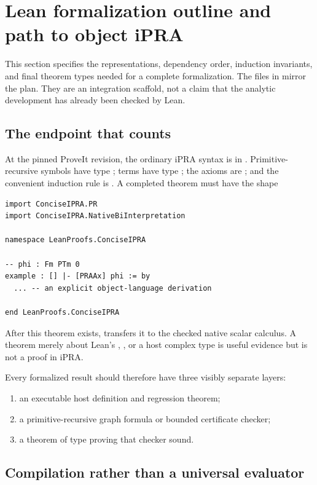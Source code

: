 \section{Lean formalization outline and path to object iPRA}\label{sec:formalization}

This section specifies the representations, dependency order, induction
invariants, and final theorem types needed for a complete formalization.  The
files in  mirror the plan.  They are an integration scaffold, not a
claim that the analytic development has already been checked by Lean.

\subsection{The endpoint that counts}

At the pinned ProveIt revision, the ordinary iPRA syntax is in
.  Primitive-recursive symbols have type
; terms have type ; the axioms are ; and the
convenient induction rule is .  A completed theorem must have
the shape
\begin{lstlisting}[language={}]
import ConciseIPRA.PR
import ConciseIPRA.NativeBiInterpretation

namespace LeanProofs.ConciseIPRA

-- phi : Fm PTm 0
example : [] |- [PRAAx] phi := by
  ... -- an explicit object-language derivation

end LeanProofs.ConciseIPRA
\end{lstlisting}
After this theorem exists,  transfers it to the checked
native scalar calculus.  A theorem merely about Lean's ,
, or a host complex type is useful evidence but is not a proof in
iPRA.

Every formalized result should therefore have three visibly separate layers:
\begin{enumerate}
\item an executable host definition and regression theorem;
\item a primitive-recursive graph formula or bounded certificate checker;
\item a theorem of type  proving that checker sound.
\end{enumerate}

\subsection{Compilation rather than a universal evaluator}

